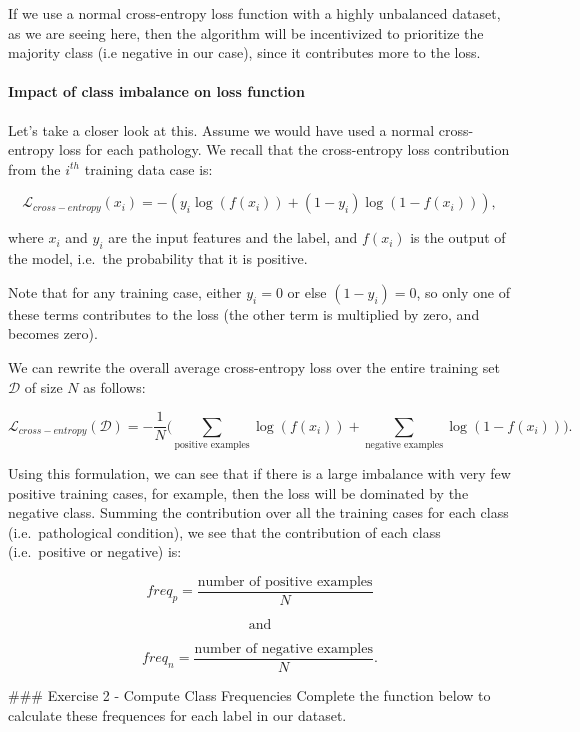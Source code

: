 \documentclass[11pt]{article}
\begin{document}
If we use a normal cross-entropy loss function with a highly unbalanced
dataset, as we are seeing here, then the algorithm will be incentivized
to prioritize the majority class (i.e negative in our case), since it
contributes more to the loss.

    \hypertarget{impact-of-class-imbalance-on-loss-function}{%
\paragraph{Impact of class imbalance on loss
function}\label{impact-of-class-imbalance-on-loss-function}}

Let's take a closer look at this. Assume we would have used a normal
cross-entropy loss for each pathology. We recall that the cross-entropy
loss contribution from the \(i^{th}\) training data case is:

\[\mathcal{L}_{cross-entropy}(x_i) = -(y_i \log(f(x_i)) + (1-y_i) \log(1-f(x_i))),\]

where \(x_i\) and \(y_i\) are the input features and the label, and
\(f(x_i)\) is the output of the model, i.e.~the probability that it is
positive.

Note that for any training case, either \(y_i=0\) or else \((1-y_i)=0\),
so only one of these terms contributes to the loss (the other term is
multiplied by zero, and becomes zero).

We can rewrite the overall average cross-entropy loss over the entire
training set \(\mathcal{D}\) of size \(N\) as follows:

\[\mathcal{L}_{cross-entropy}(\mathcal{D}) = - \frac{1}{N}\big( \sum_{\text{positive examples}} \log (f(x_i)) + \sum_{\text{negative examples}} \log(1-f(x_i)) \big).\]

Using this formulation, we can see that if there is a large imbalance
with very few positive training cases, for example, then the loss will
be dominated by the negative class. Summing the contribution over all
the training cases for each class (i.e.~pathological condition), we see
that the contribution of each class (i.e.~positive or negative) is:

\[freq_{p} = \frac{\text{number of positive examples}}{N} \]

\[\text{and}\]

\[freq_{n} = \frac{\text{number of negative examples}}{N}.\]

     \#\#\# Exercise 2 - Compute Class Frequencies Complete the function
below to calculate these frequences for each label in our dataset.
\end{document}
